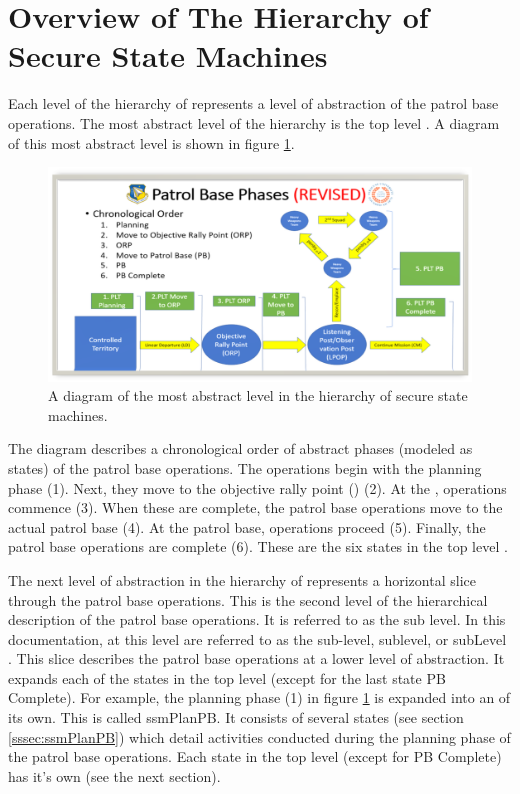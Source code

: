 \documentclass[../../main/main.tex]{subfiles}
\begin{document}
\section{Overview of The Hierarchy of Secure State Machines}\label{sec:overview}

Each level of the hierarchy of  represents a level of abstraction of the patrol base operations. The most abstract level of the hierarchy is the top level .  A diagram of this most abstract level is shown in figure \ref{pbtoplevel}.

\begin{figure}[h]
\includegraphics[width=\textwidth]{../figures/pbtoplevel}
\caption{\label{pbtoplevel}A diagram of the most abstract level in the hierarchy of secure state machines.}
\end{figure}

The diagram describes a chronological order of abstract phases (modeled as states) of the patrol base operations.  The operations begin with the planning phase (1).  Next, they move to the objective rally point () (2). At the , operations commence (3).  When these are complete, the patrol base operations move to the actual patrol base (4).  At the patrol base, operations proceed (5).  Finally, the patrol base operations are complete (6).  These are the six states in the top level .


The next level of abstraction in the hierarchy of  represents a horizontal slice through the patrol base operations.  This is the second level of the hierarchical description of the patrol base operations. It is referred to as the sub level.  In this documentation,  at this level are referred to as the sub-level, sublevel, or subLevel . This slice describes the patrol base operations at a lower level of abstraction.  It expands each of the states in the top level (except for the last state PB Complete).  For example, the planning phase (1) in figure \ref{pbtoplevel} is expanded into an  of its own.  This is called ssmPlanPB.  It consists of several states (see section \ref{sssec:ssmPlanPB}) which detail activities conducted during the planning phase of the patrol base operations.  Each state in the top level (except for PB Complete) has it's own  (see the next section).
\end{document}
